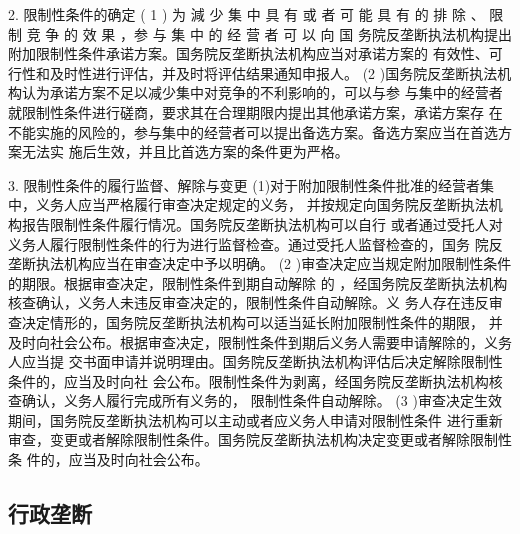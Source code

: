 \documentclass[UTF8,12pt]{ctexart}
\numberwithin{equation}{section} %
\numberwithin{figure}{section}
\numberwithin{table}{section}
\begin{document}
	2. 限制性条件的确定
	( 1 ) 为 減 少 集 中 具 有 或 者 可 能 具 有 的 排 除 、 限 制 竞 争 的 效 果 ，参 与 集 中 的 经 营 者 可 以 向 国 务院反垄断执法机构提出附加限制性条件承诺方案。国务院反垄断执法机构应当对承诺方案的 有效性、可行性和及时性进行评估，并及时将评估结果通知申报人。
	(2 )国务院反垄断执法机构认为承诺方案不足以减少集中对竞争的不利影响的，可以与参 与集中的经营者就限制性条件进行磋商，要求其在合理期限内提出其他承诺方案，承诺方案存 在不能实施的风险的，参与集中的经营者可以提出备选方案。备选方案应当在首选方案无法实 施后生效，并且比首选方案的条件更为严格。
	
	3. 限制性条件的履行监督、解除与变更 (1)对于附加限制性条件批准的经营者集中，义务人应当严格履行审查决定规定的义务， 并按规定向国务院反垄断执法机构报告限制性条件履行情况。国务院反垄断执法机构可以自行 或者通过受托人对义务人履行限制性条件的行为进行监督检查。通过受托人监督检查的，国务 院反垄断执法机构应当在审查决定中予以明确。
	(2 )审查决定应当规定附加限制性条件的期限。根据审查决定，限制性条件到期自动解除 的 ，经国务院反垄断执法机构核查确认，义务人未违反审查决定的，限制性条件自动解除。义 务人存在违反审查决定情形的，国务院反垄断执法机构可以适当延长附加限制性条件的期限， 并及时向社会公布。根据审查决定，限制性条件到期后义务人需要申请解除的，义务人应当提 交书面申请并说明理由。国务院反垄断执法机构评估后决定解除限制性条件的，应当及时向社 会公布。限制性条件为剥离，经国务院反垄断执法机构核查确认，义务人履行完成所有义务的， 限制性条件自动解除。
	(3 )审查决定生效期间，国务院反垄断执法机构可以主动或者应义务人申请对限制性条件 进行重新审查，变更或者解除限制性条件。国务院反垄断执法机构决定变更或者解除限制性条 件的，应当及时向社会公布。
	
	\subsection{行政垄断}
	
\end{document}

